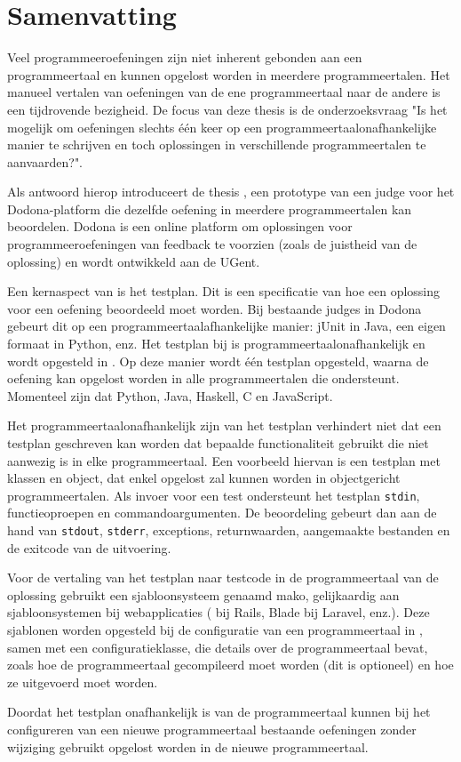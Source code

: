 \chapter*{Samenvatting}

Veel programmeeroefeningen zijn niet inherent gebonden aan een programmeertaal en kunnen opgelost worden in meerdere programmeertalen.
Het manueel vertalen van oefeningen van de ene programmeertaal naar de andere is een tijdrovende bezigheid.
De focus van deze thesis is de onderzoeksvraag "Is het mogelijk om oefeningen slechts één keer op een programmeertaalonafhankelijke manier te schrijven en toch oplossingen in verschillende programmeertalen te aanvaarden?".

Als antwoord hierop introduceert de thesis \tested{}, een prototype van een judge voor het Dodona-platform die dezelfde oefening in meerdere programmeertalen kan beoordelen.
Dodona is een online platform om oplossingen voor programmeeroefeningen van feedback te voorzien (zoals de juistheid van de oplossing) en wordt ontwikkeld aan de UGent.

Een kernaspect van \tested{} is het testplan.
Dit is een specificatie van hoe een oplossing voor een oefening beoordeeld moet worden.
Bij bestaande judges in Dodona gebeurt dit op een programmeertaalafhankelijke manier: jUnit in Java, een eigen formaat in Python, enz.
Het testplan bij \tested{} is programmeertaalonafhankelijk en wordt opgesteld in .
Op deze manier wordt één testplan opgesteld, waarna de oefening kan opgelost worden in alle programmeertalen die \tested{} ondersteunt.
Momenteel zijn dat Python, Java, Haskell, C en JavaScript.

Het programmeertaalonafhankelijk zijn van het testplan verhindert niet dat een testplan geschreven kan worden dat bepaalde functionaliteit gebruikt die niet aanwezig is in elke programmeertaal.
Een voorbeeld hiervan is een testplan met klassen en object, dat enkel opgelost zal kunnen worden in objectgericht programmeertalen.
Als invoer voor een test ondersteunt het testplan \texttt{stdin}, functieoproepen en commandoargumenten.
De beoordeling gebeurt dan aan de hand van \texttt{stdout}, \texttt{stderr}, exceptions, returnwaarden, aangemaakte bestanden en de exitcode van de uitvoering.

Voor de vertaling van het testplan naar testcode in de programmeertaal van de oplossing gebruikt \tested{} een sjabloonsysteem genaamd mako, gelijkaardig aan sjabloonsystemen bij webapplicaties ( bij Rails, Blade bij Laravel, enz.).
Deze sjablonen worden opgesteld bij de configuratie van een programmeertaal in \tested{}, samen met een configuratieklasse, die details over de programmeertaal bevat, zoals hoe de programmeertaal gecompileerd moet worden (dit is optioneel) en hoe ze uitgevoerd moet worden.

Doordat het testplan onafhankelijk is van de programmeertaal kunnen bij het configureren van een nieuwe programmeertaal bestaande oefeningen zonder wijziging gebruikt opgelost worden in de nieuwe programmeertaal.
